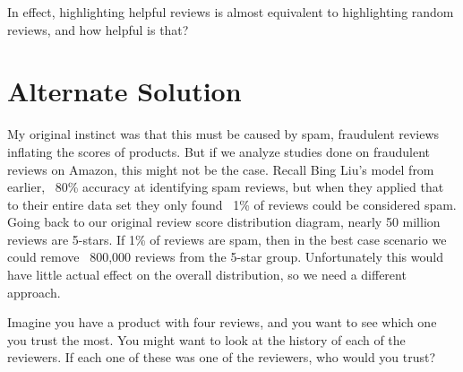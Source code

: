 \documentclass[a4paper,10pt]{article}
\begin{document}
In effect, highlighting helpful reviews is almost equivalent to highlighting random reviews, and how helpful is that?

\section*{Alternate Solution}
My original instinct was that this must be caused by spam, fraudulent reviews inflating the scores of products. But if we analyze studies done on fraudulent reviews on Amazon, this might not be the case. Recall Bing Liu's model from earlier, ~80\% accuracy at identifying spam reviews, but when they applied that to their entire data set they only found ~1\% of reviews could be considered spam. Going back to our original review score distribution diagram, nearly 50 million reviews are 5-stars. If 1\% of reviews are spam, then in the best case scenario we could remove ~800,000 reviews from the 5-star group. Unfortunately this would have little actual effect on the overall distribution, so we need a different approach.

Imagine you have a product with four reviews, and you want to see which one you trust the most. You might want to look at the history of each of the reviewers. If each one of these was one of the reviewers, who would you trust?
\end{document}
